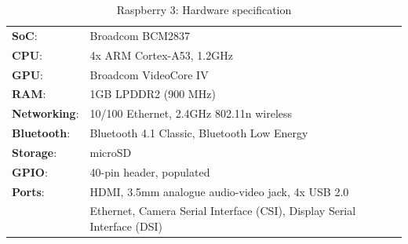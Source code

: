 \begin{table}[H]
 \begin{center}
   \begin{tabular}{l l}
   \hline
   	\textbf{SoC}: & Broadcom BCM2837\\
	\textbf{CPU}: & 4x ARM Cortex-A53, 1.2GHz\\
	\textbf{GPU}: & Broadcom VideoCore IV\\
	\textbf{RAM}: & 1GB LPDDR2 (900 MHz)\\
	\textbf{Networking}: & 10/100 Ethernet, 2.4GHz 802.11n wireless\\
	\textbf{Bluetooth}: & Bluetooth 4.1 Classic, Bluetooth Low Energy\\
	\textbf{Storage}: & microSD\\
	\textbf{GPIO}: & 40-pin header, populated\\
	\textbf{Ports}: & HDMI, 3.5mm analogue audio-video jack, 4x USB 2.0\\
	&Ethernet, Camera Serial Interface (CSI), Display Serial Interface (DSI) \\
   \hline
   \end{tabular}
 \end{center}
 \caption{Raspberry 3: Hardware specification}
 \label{tab:tab1}
\end{table}

